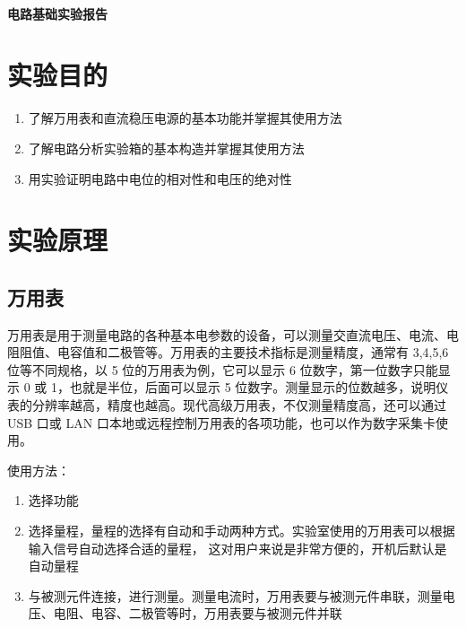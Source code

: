 \documentclass[a4paper,utf8]{article}
\begin{document}
\begin{center}
    {\mbox{}\\[7em]\bfseries\songti%
    电路基础实验报告}\\[34mm]
    \pointingbox
\end{center}
\newpage
\section{实验目的}
\begin{enumerate}
    \item 了解万用表和直流稳压电源的基本功能并掌握其使用方法
    \item 了解电路分析实验箱的基本构造并掌握其使用方法
    \item 用实验证明电路中电位的相对性和电压的绝对性
\end{enumerate}

\section{实验原理}%
    \subsection{万用表}
        万用表是用于测量电路的各种基本电参数的设备，可以测量交直流电压、电流、电阻阻值、电容值和二极管等。万用表的主要技术指标是测量精度，通常有 3,4,5,6位等不同规格，以 5 位的万用表为例，它可以显示 6 位数字，第一位数字只能显示 0 或 1，也就是半位，后面可以显示 5 位数字。测量显示的位数越多，说明仪表的分辨率越高，精度也越高。现代高级万用表，不仅测量精度高，还可以通过 USB 口或 LAN 口本地或远程控制万用表的各项功能，也可以作为数字采集卡使用。\par
        使用方法：
        \begin{enumerate}
            \item 选择功能
            \item 选择量程，量程的选择有自动和手动两种方式。实验室使用的万用表可以根据输入信号自动选择合适的量程， 这对用户来说是非常方便的，开机后默认是自动量程
            \item 与被测元件连接，进行测量。测量电流时，万用表要与被测元件串联，测量电压、电阻、电容、二极管等时，万用表要与被测元件并联
        \end{enumerate}
\end{document}
